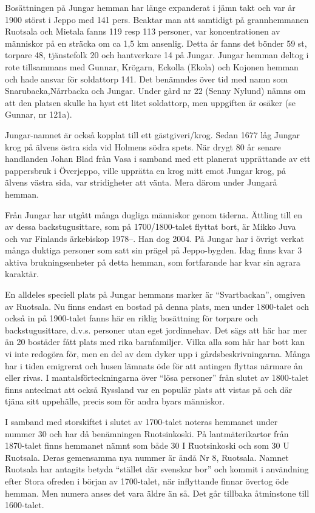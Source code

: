 Bosättningen på Jungar hemman har länge expanderat i jämn takt och var år 1900 störst i Jeppo med 141 pers. Beaktar man att samtidigt på grannhemmanen Ruotsala och Mietala fanns 119 resp 113 personer, var koncentrationen av människor på en sträcka om ca 1,5 km ansenlig. Detta år fanns det bönder 59 st, torpare 48, tjänstefolk 20 och hantverkare 14 på Jungar. Jungar hemman deltog i rote tillsammans med Gunnar, Krögarn, Eckolla (Ekola) och Kojonen hemman och hade ansvar för soldattorp 141. Det benämndes över tid med namn som Snarubacka,Nårrbacka och Jungar. Under gård nr 22 (Senny Nylund) nämns om att den platsen skulle ha hyst ett litet soldattorp, men uppgiften är osäker (se Gunnar, nr 121a).

Jungar-namnet är också kopplat till ett gästgiveri/krog. Sedan 1677 låg Jungar krog på älvens östra sida vid Holmens södra spets. När  drygt 80 år senare handlanden Johan Blad från Vasa i samband med ett planerat upprättande av ett pappersbruk i Överjeppo, ville upprätta en krog mitt emot Jungar krog,  på älvens västra sida, var stridigheter att vänta. Mera därom under Jungarå hemman.

Från Jungar har utgått många dugliga människor genom tiderna. Ättling till en av dessa backstugusittare, som på 1700/1800-talet flyttat bort, är Mikko Juva och var Finlands ärkebiskop 1978--. Han dog 2004. På Jungar har i övrigt verkat många duktiga personer som satt sin prägel på Jeppo-bygden. Idag finns kvar 3 aktiva brukningsenheter på detta hemman, som fortfarande har kvar sin agrara karaktär.

En alldeles speciell plats på Jungar hemmans marker är ``Svartbackan'', omgiven av Ruotsala. Nu finns endast en bostad på denna plats, men under 1800-talet och också in på 1900-talet fanns här en riklig bosättning för torpare och backstugusittare, d.v.s. personer utan eget jordinnehav. Det sägs att här har mer än 20 bostäder fått plats med rika barnfamiljer. Vilka alla som här har bott kan vi inte redogöra för, men en del av dem dyker upp i gårdsbeskrivningarna. Många har i tiden emigrerat och husen lämnats öde för att antingen flyttas närmare ån eller rivas. I mantalsförteckningarna över ``lösa personer'' från slutet av 1800-talet finns antecknat att också Ryssland var en populär plats att vistas på och där tjäna sitt uppehälle, precis som för andra byars människor.



I samband med storskiftet i slutet av 1700-talet noteras hemmanet under nummer 30 och har då benämningen Ruotsinkoski. På lantmäterikartor från 1870-talet finns hemmanet nämnt som både 30 I \= Ruotsinkoski och som 30 U \= Ruotsala. Deras gemensamma nya nummer är ändå Nr 8, Ruotsala. Namnet Ruotsala har antagits betyda ``stället där svenskar bor'' och kommit i användning efter Stora ofreden i början av 1700-talet, när inflyttande finnar övertog öde hemman. Men numera anses det vara äldre än så. Det går tillbaka åtminstone till 1600-talet.

